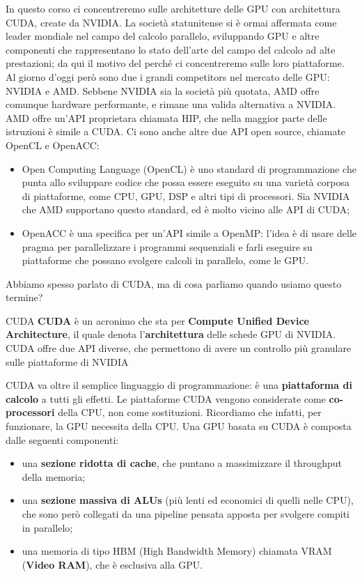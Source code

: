 In questo corso ci concentreremo sulle architetture delle GPU con architettura CUDA, create da NVIDIA. La società statunitense si è ormai affermata come leader mondiale nel campo del calcolo parallelo, sviluppando GPU e altre componenti che rappresentano lo stato dell'arte del campo del calcolo ad alte prestazioni; da qui il motivo del perché ci concentreremo sulle loro piattaforme.
\nl
Al giorno d'oggi però sono due i grandi competitors nel mercato delle GPU: NVIDIA e AMD. Sebbene NVIDIA sia la società più quotata, AMD offre comunque hardware performante, e rimane una valida alternativa a NVIDIA. AMD offre un'API proprietara chiamata HIP, che nella maggior parte delle istruzioni è simile a CUDA. Ci sono anche altre due API open source, chiamate OpenCL e OpenACC:
\begin{itemize}
    \item Open Computing Language (OpenCL) è uno standard di programmazione che punta allo sviluppare codice che possa essere eseguito su una varietà corposa di piattaforme, come CPU, GPU, DSP e altri tipi di processori. Sia NVIDIA che AMD supportano questo standard, ed è molto vicino alle API di CUDA;
    \item OpenACC è una specifica per un'API simile a OpenMP: l'idea è di usare delle pragma per parallelizzare i programmi sequenziali e farli eseguire su piattaforme che possano svolgere calcoli in parallelo, come le GPU.
\end{itemize}

Abbiamo spesso parlato di CUDA, ma di cosa parliamo quando usiamo questo termine? 

\begin{definition}{CUDA}
    \textbf{CUDA} è un acronimo che sta per \textbf{Compute Unified Device Architecture}, il quale denota l'\textbf{architettura} delle schede GPU di NVIDIA. CUDA offre due API diverse, che permettono di avere un controllo più granulare sulle piattaforme di NVIDIA
\end{definition}

CUDA va oltre il semplice linguaggio di programmazione: è una \textbf{piattaforma di calcolo} a tutti gli effetti. Le piattaforme CUDA vengono considerate come \textbf{co-processori} della CPU, non come sostituzioni. Ricordiamo che infatti, per funzionare, la GPU necessita della CPU.
\nl
Una GPU basata su CUDA è composta dalle seguenti componenti:
\begin{itemize}
    \item una \textbf{sezione ridotta di cache}, che puntano a massimizzare il throughput della memoria;
    \item una \textbf{sezione massiva di ALUs} (più lenti ed economici di quelli nelle CPU), che sono però collegati da una pipeline pensata apposta per svolgere compiti in parallelo;
    \item una memoria di tipo HBM (High Bandwidth Memory) chiamata VRAM (\textbf{Video RAM}), che è esclusiva alla GPU.
\end{itemize}

